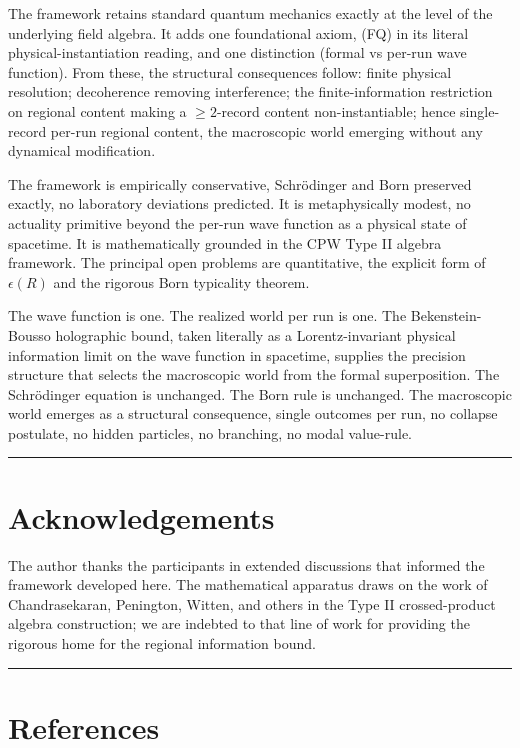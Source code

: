 \documentclass[11pt,a4paper]{article}
\begin{document}
The framework retains standard quantum mechanics exactly at the level of the underlying field algebra. It adds one foundational axiom, (FQ) in its literal physical-instantiation reading, and one distinction (formal vs per-run wave function). From these, the structural consequences follow: finite physical resolution; decoherence removing interference; the finite-information restriction on regional content making a $\ge 2$-record content non-instantiable; hence single-record per-run regional content, the macroscopic world emerging without any dynamical modification.

The framework is empirically conservative, Schrödinger and Born preserved exactly, no laboratory deviations predicted. It is metaphysically modest, no actuality primitive beyond the per-run wave function as a physical state of spacetime. It is mathematically grounded in the CPW Type II algebra framework. The principal open problems are quantitative, the explicit form of $\epsilon(R)$ and the rigorous Born typicality theorem.

The wave function is one. The realized world per run is one. The Bekenstein-Bousso holographic bound, taken literally as a Lorentz-invariant physical information limit on the wave function in spacetime, supplies the precision structure that selects the macroscopic world from the formal superposition. The Schrödinger equation is unchanged. The Born rule is unchanged. The macroscopic world emerges as a structural consequence, single outcomes per run, no collapse postulate, no hidden particles, no branching, no modal value-rule.

\medskip\hrule\medskip

\section{Acknowledgements}

The author thanks the participants in extended discussions that informed the framework developed here. The mathematical apparatus draws on the work of Chandrasekaran, Penington, Witten, and others in the Type II crossed-product algebra construction; we are indebted to that line of work for providing the rigorous home for the regional information bound.

\medskip\hrule\medskip

\section{References}
\end{document}
